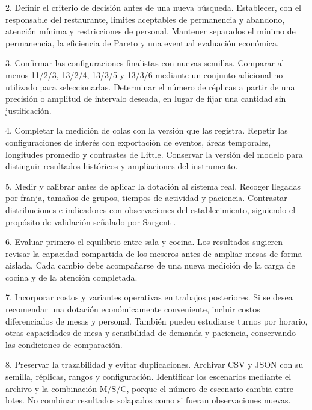 \documentclass[10pt,a4paper,twocolumn]{article}
\begin{document}
2. Definir el criterio de decisión antes de una nueva búsqueda. Establecer, con el responsable del restaurante, límites aceptables de permanencia y abandono, atención mínima y restricciones de personal. Mantener separados el mínimo de permanencia, la eficiencia de Pareto y una eventual evaluación económica.

3. Confirmar las configuraciones finalistas con nuevas semillas. Comparar al menos 11/2/3, 13/2/4, 13/3/5 y 13/3/6 mediante un conjunto adicional no utilizado para seleccionarlas. Determinar el número de réplicas a partir de una precisión o amplitud de intervalo deseada, en lugar de fijar una cantidad sin justificación.

4. Completar la medición de colas con la versión que las registra. Repetir las configuraciones de interés con exportación de eventos, áreas temporales, longitudes promedio y contrastes de Little. Conservar la versión del modelo para distinguir resultados históricos y ampliaciones del instrumento.

5. Medir y calibrar antes de aplicar la dotación al sistema real. Recoger llegadas por franja, tamaños de grupos, tiempos de actividad y paciencia. Contrastar distribuciones e indicadores con observaciones del establecimiento, siguiendo el propósito de validación señalado por Sargent \cite{ref3}.

6. Evaluar primero el equilibrio entre sala y cocina. Los resultados sugieren revisar la capacidad compartida de los meseros antes de ampliar mesas de forma aislada. Cada cambio debe acompañarse de una nueva medición de la carga de cocina y de la atención completada.

7. Incorporar costos y variantes operativas en trabajos posteriores. Si se desea recomendar una dotación económicamente conveniente, incluir costos diferenciados de mesas y personal. También pueden estudiarse turnos por horario, otras capacidades de mesa y sensibilidad de demanda y paciencia, conservando las condiciones de comparación.

8. Preservar la trazabilidad y evitar duplicaciones. Archivar CSV y JSON con su semilla, réplicas, rangos y configuración. Identificar los escenarios mediante el archivo y la combinación M/S/C, porque el número de escenario cambia entre lotes. No combinar resultados solapados como si fueran observaciones nuevas.
\end{document}
